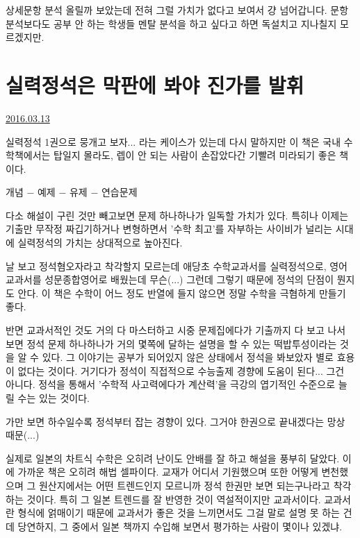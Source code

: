 상세문항 분석 올릴까 보았는데 전혀 그럴 가치가 없다고 보여서 걍 넘어갑니다.
문항분석보다도 공부 안 하는 학생들 멘탈 분석을 하고 싶다고 하면 독설치고 지나칠지 모르겠지만.
\vspace{5mm}









\section{실력정석은 막판에 봐야 진가를 발휘}
\href{https://www.kockoc.com/Apoc/675627}{2016.03.13}

\vspace{5mm}

실력정석 1권으로 뭉개고 보자... 라는 케이스가 있는데
다시 말하지만 이 책은 국내 수학책에서는 탑일지 몰라도, 렙이 안 되는 사람이 손잡았다간 기빨려 미라되기 좋은 책이다.
\vspace{5mm}

개념 $-$ 예제 $-$ 유제 $-$ 연습문제
\vspace{5mm}

다소 해설이 구린 것만 빼고보면 문제 하나하나가 일독할 가치가 있다.
특히나 이제는 기출만 무작정 짜깁기하거나 변형하면서 '수학 최고'를 자부하는 사이비가 널리는 시대에 실력정석의 가치는 상대적으로 높아진다.
\vspace{5mm}

날 보고 정석혐오자라고 착각할지 모르는데
애당초 수학교과서를 실력정석으로, 영어교과서를 성문종합영어로 배웠는데 무슨(...)
그런데 그렇기 때문에 정석의 단점이 뭔지도 안다. 이 책은 수학이 어느 정도 반열에 들지 않으면 정말 수학을 극혐하게 만들기 좋다.
\vspace{5mm}

반면 교과서적인 것도 거의 다 마스터하고 시중 문제집에다가 기출까지 다 보고 나서 보면
정석 문제 하나하나가 거의 몇쪽에 달하는 설명을 할 수 있는 떡밥투성이라는 것을 알 수 있다.
그 이야기는 공부가 되어있지 않은 상태에서 정석을 봐보았자 별로 효용이 없다는 것이다.
거기다가 정석이 직접적으로 수능출제 경향에 도움이 된다... 그건 아니다.
정석을 통해서 '수학적 사고력에다가 계산력'을 극강의 엽기적인 수준으로 늘릴 수는 있는 것이다.
\vspace{5mm}

가만 보면 하수일수록 정석부터 잡는 경향이 있다. 그거야 한권으로 끝내겠다는 망상 때문(...)
\vspace{5mm}

실제로 일본의 차트식 수학은 오히려 난이도 안배를 잘 하고 해설을 풍부히 달았다. 이에 가까운 책은 오히려 해법 셀파이다.
교재가 어디서 기원했으며 또한 어떻게 변천했으며 그 원산지에서는 어떤 트렌드인지 모르니까 정석 한권만 보면 되는구나라고 착각하는 것이다.
특히 그 일본 트렌드를 잘 반영한 것이 역설적이지만 교과서이다.
교과서란 형식에 얽매이기 때문에 교과서가 좋은 것을 느끼면서도 그걸 말로 설명 못 하는 건데
당연하지, 그 중에서 일본 책까지 수입해 보면서 평가하는 사람이 몇이나 있겠냐.
\vspace{5mm}

